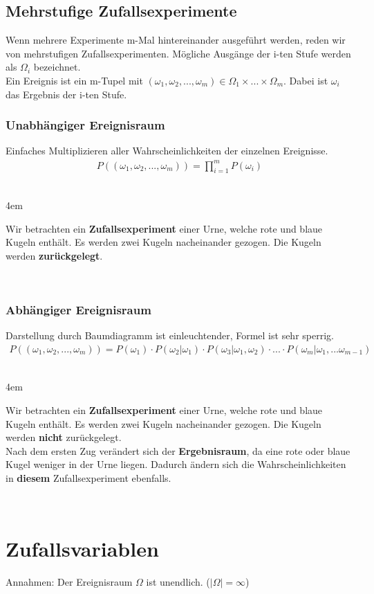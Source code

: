 \documentclass[a4paper]{article}
\newenvironment{exEnv}{\ \\\begin{addmargin}[4em]{4em}\begin{em}}{\end{em}\end{addmargin}\ }
\begin{document}
	
	\subsection{Mehrstufige Zufallsexperimente}
	Wenn mehrere Experimente m-Mal hintereinander ausgeführt werden, reden wir von mehrstufigen Zufallsexperimenten. Mögliche Ausgänge der i-ten Stufe werden als $\Omega_i$ bezeichnet.\\
	Ein Ereignis ist ein m-Tupel mit $(\omega_1, \omega_2, ..., \omega_m) \in \Omega_1 \times ... \times \Omega_m$. Dabei ist $\omega_i$ das Ergebnis der i-ten Stufe.
	
	\subsubsection{Unabhängiger Ereignisraum}
		Einfaches Multiplizieren aller Wahrscheinlichkeiten der einzelnen Ereignisse. 
		\begin{align*}
			P((\omega_1, \omega_2, ..., \omega_m)) = \prod_{i = 1}^{m} P(\omega_i)
		\end{align*}
		\begin{exEnv}
			Wir betrachten ein \textbf{Zufallsexperiment} einer Urne, welche rote und blaue Kugeln enthält. Es werden zwei Kugeln nacheinander gezogen. Die Kugeln werden \textbf{zurückgelegt}.
		\end{exEnv}
	\subsubsection{Abhängiger Ereignisraum}
		Darstellung durch Baumdiagramm ist einleuchtender, Formel ist sehr sperrig.
		\begin{align*}
			P((\omega_1, \omega_2, ..., \omega_m)) = P(\omega_1) \cdot P(\omega_2 | \omega_1) \cdot P(\omega_3 | \omega_1, \omega_2) \cdot ... \cdot P(\omega_m | \omega_1, ... \omega_{m-1})
		\end{align*}	
		\begin{exEnv}
			Wir betrachten ein \textbf{Zufallsexperiment} einer Urne, welche rote und blaue Kugeln enthält. Es werden zwei Kugeln nacheinander gezogen. Die Kugeln werden \textbf{nicht} zurückgelegt.\\
			Nach dem ersten Zug verändert sich der \textbf{Ergebnisraum}, da eine rote oder blaue Kugel weniger in der Urne liegen. Dadurch ändern sich die Wahrscheinlichkeiten in \textbf{diesem} Zufallsexperiment ebenfalls.
		\end{exEnv}

\section{Zufallsvariablen}
	Annahmen: Der Ereignisraum $\Omega$ ist unendlich. ($|\Omega| = \infty$)
\end{document}
